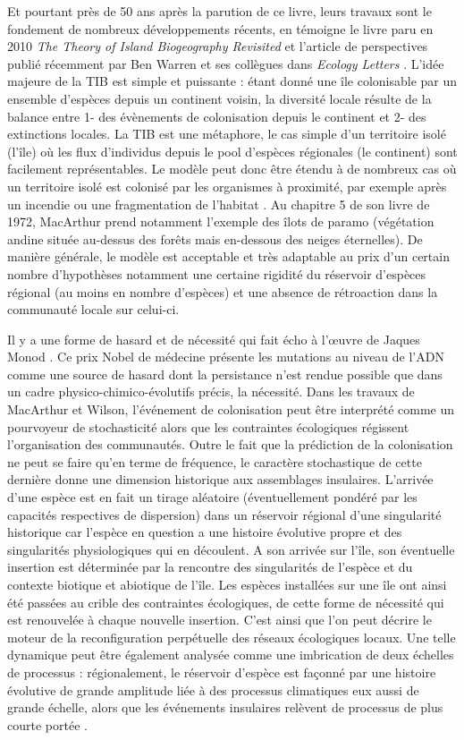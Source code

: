 Et pourtant près de 50 ans après la parution de ce livre, leurs travaux
sont le fondement de nombreux développements récents, en témoigne le
livre paru en 2010 \emph{The Theory of Island Biogeography Revisited}
\citep{Losos2010} et l'article de perspectives publié récemment par Ben
Warren et ses collègues dans \emph{Ecology Letters} \citep{Warren2015}.
L'idée majeure de la TIB est simple et puissante : étant donné une île
colonisable par un ensemble d'espèces depuis un continent voisin, la
diversité locale résulte de la balance entre 1- des évènements de
colonisation depuis le continent et 2- des extinctions locales. La TIB
est une métaphore, le cas simple d'un territoire isolé (l'île) où les
flux d'individus depuis le pool d'espèces régionales (le continent) sont
facilement représentables. Le modèle peut donc être étendu à de nombreux
cas où un territoire isolé est colonisé par les organismes à proximité,
par exemple après un incendie ou une fragmentation de l'habitat
\citep{Cook2002}. Au chapitre 5 de son livre de 1972, MacArthur prend
notamment l'exemple des îlots de paramo (végétation andine située
au-dessus des forêts mais en-dessous des neiges éternelles). De manière
générale, le modèle est acceptable et très adaptable au prix d'un
certain nombre d'hypothèses notamment une certaine rigidité du réservoir
d'espèces régional (au moins en nombre d'espèces) et une absence de
rétroaction dans la communauté locale sur celui-ci.

Il y a une forme de hasard et de nécessité qui fait écho à l'œuvre de
Jaques Monod \citep{monod1970hasard}. Ce prix Nobel de médecine présente
les mutations au niveau de l'ADN comme une source de hasard dont la
persistance n'est rendue possible que dans un cadre
physico-chimico-évolutifs précis, la nécessité. Dans les travaux de
MacArthur et Wilson, l'événement de colonisation peut être interprété
comme un pourvoyeur de stochasticité alors que les contraintes
écologiques régissent l'organisation des communautés. Outre le fait que
la prédiction de la colonisation ne peut se faire qu'en terme de
fréquence, le caractère stochastique de cette dernière donne une
dimension historique aux assemblages insulaires. L'arrivée d'une espèce
est en fait un tirage aléatoire (éventuellement pondéré par les
capacités respectives de dispersion) dans un réservoir régional d'une
singularité historique car l'espèce en question a une histoire évolutive
propre et des singularités physiologiques qui en découlent. A son
arrivée sur l'île, son éventuelle insertion est déterminée par la
rencontre des singularités de l'espèce et du contexte biotique et
abiotique de l'île. Les espèces installées sur une île ont ainsi été
passées au crible des contraintes écologiques, de cette forme de
nécessité qui est renouvelée à chaque nouvelle insertion. C'est ainsi
que l'on peut décrire le moteur de la reconfiguration perpétuelle des
réseaux écologiques locaux. Une telle dynamique peut être également
analysée comme une imbrication de deux échelles de processus :
régionalement, le réservoir d'espèce est façonné par une histoire
évolutive de grande amplitude liée à des processus climatiques eux aussi
de grande échelle, alors que les événements insulaires relèvent de
processus de plus courte portée \citep{Ricklefs1987}.

